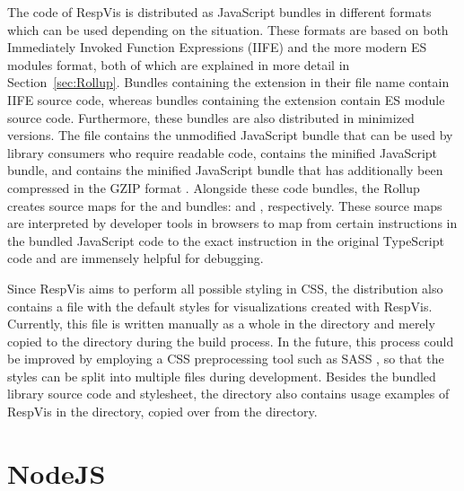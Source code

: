 The code of RespVis is distributed as JavaScript bundles in different
formats which can be used depending on the situation. These formats
are based on both Immediately Invoked Function Expressions (IIFE) and
the more modern ES modules format, both of which are explained in more
detail in Section~\ref{sec:Rollup}. Bundles containing the 
extension in their file name contain IIFE source code, whereas bundles
containing the  extension contain ES module source code.
Furthermore, these bundles are also distributed in minimized
versions. The  file contains the unmodified
JavaScript bundle that can be used by library consumers who require
readable code,  contains the minified
JavaScript bundle, and  contains the
minified JavaScript bundle that has additionally been compressed in
the GZIP format \parencite{GZIP}. Alongside these code bundles, the
Rollup creates source maps for the  and
 bundles: 
and , respectively. These source maps
are interpreted by developer tools in browsers to map from certain
instructions in the bundled JavaScript code to the exact instruction
in the original TypeScript code and are immensely helpful for
debugging.

Since RespVis aims to perform all possible styling in CSS, the
distribution also contains a  file with the
default styles for visualizations created with RespVis. Currently,
this file is written manually as a whole in the  directory
and merely copied to the  directory during the build
process. In the future, this process could be improved by employing a
CSS preprocessing tool such as SASS \parencite{SASS}, so that the
styles can be split into multiple files during development. Besides
the bundled library source code and stylesheet, the 
directory also contains usage examples of RespVis in the
 directory, copied over from the
 directory.






\section{NodeJS}

